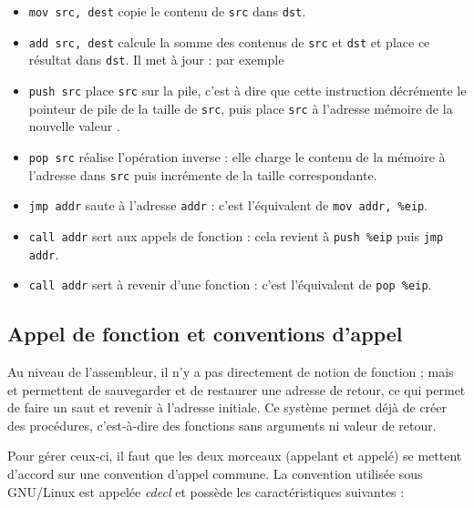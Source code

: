 \begin{itemize}

\item \texttt{mov src, dest} copie le contenu de \texttt{src} dans \texttt{dst}.

\item \texttt{add src, dest} calcule la somme des contenus de \texttt{src} et
  \texttt{dst} et place ce résultat dans \texttt{dst}. Il met à jour \eflags:
  par exemple

\item \texttt{push src} place \texttt{src} sur la pile, c'est à dire que cette
  instruction décrémente le pointeur de pile \esp de la taille de \texttt{src},
  puis place \texttt{src} à l'adresse mémoire de la nouvelle valeur \esp.

\item \texttt{pop src} réalise l'opération inverse : elle charge le contenu de
  la mémoire à l'adresse \esp dans \texttt{src} puis incrémente \esp de la
  taille correspondante.

\item \texttt{jmp addr} saute à l'adresse \texttt{addr} : c'est l'équivalent de
  \texttt{mov addr, \%eip}.

\item \texttt{call addr} sert aux appels de fonction : cela revient à
  \texttt{push \%eip} puis \texttt{jmp addr}.

\item \texttt{call addr} sert à revenir d'une fonction : c'est l'équivalent de
  \texttt{pop \%eip}.

\end{itemize}


\subsection{Appel de fonction et conventions d'appel}

Au niveau de l'assembleur, il n'y a pas directement de notion de fonction ; mais
 et  permettent de sauvegarder et de restaurer une
adresse de retour, ce qui permet de faire un saut et revenir à l'adresse initiale.
Ce système permet déjà de créer des procédures, c'est-à-dire des fonctions sans
arguments ni valeur de retour.

Pour gérer ceux-ci, il faut que les deux morceaux (appelant et appelé) se
mettent d'accord sur une convention d'appel commune. La convention utilisée sous
GNU/Linux est appelée \emph{cdecl} et possède les caractéristiques suivantes :

